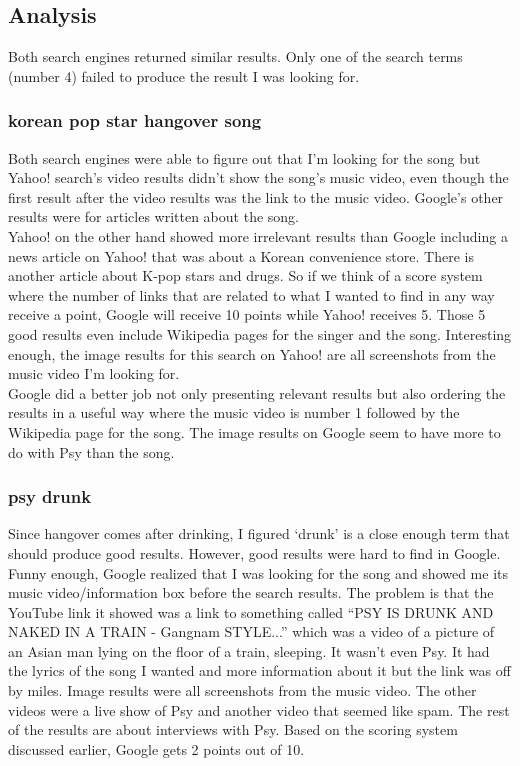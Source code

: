 \documentclass[10pt,letterpaper,bibliography=totoc]{scrartcl}
\begin{document}
\subsection{Analysis}
Both search engines returned similar results. Only one of the search terms (number 4) failed to produce the result I was looking for. 

\subsubsection{korean pop star hangover song}
Both search engines were able to figure out that I'm looking for the song but Yahoo! search's video results didn't show the song's music video, even though the first result after the video results was the link to the music video. Google's other results were for articles written about the song.\\

Yahoo! on the other hand showed more irrelevant results than Google including a news article on Yahoo! that was about a Korean convenience store. There is another article about K-pop stars and drugs. So if we think of a score system where the number of links that are related to what I wanted to find in any way receive a point, Google will receive 10 points while Yahoo! receives 5. Those 5 good results even include Wikipedia pages for the singer and the song. Interesting enough, the image results for this search on Yahoo! are all screenshots from the music video I'm looking for. \\

Google did a better job not only presenting relevant results but also ordering the results in a useful way where the music video is number 1 followed by the Wikipedia page for the song. The image results on Google seem to have more to do with Psy than the song.

\subsubsection{psy drunk}
Since hangover comes after drinking, I figured `drunk' is a close enough term that should produce good results. However, good results were hard to find in Google. Funny enough, Google realized that I was looking for the song and showed me its music video/information box before the search results. The problem is that the YouTube link it showed was a link to something called ``PSY IS DRUNK AND NAKED IN A TRAIN - Gangnam STYLE...'' which was a video of a picture of an Asian man lying on the floor of a train, sleeping. It wasn't even Psy. It had the lyrics of the song I wanted and more information about it but the link was off by miles. Image results were all screenshots from the music video. The other videos were a live show of Psy and another video that seemed like spam. The rest of the results are about interviews with Psy. Based on the scoring system discussed earlier, Google gets 2 points out of 10. \\
\end{document}
